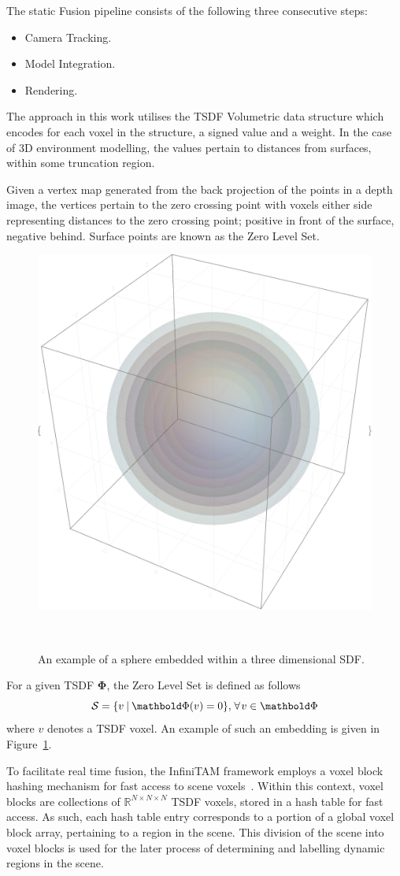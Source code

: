The static Fusion pipeline consists of the following three consecutive steps:
\begin{itemize}
  \item Camera Tracking.
  \item Model Integration.
  \item Rendering.
\end{itemize}

The approach in this work utilises the TSDF Volumetric data structure which
encodes for each voxel in the structure, a signed value and a weight.
In the case of 3D environment modelling, the values pertain to distances from
surfaces, within some truncation region.

Given a vertex map generated from the back projection of the points in a depth
image, the vertices pertain to the zero crossing point with voxels either side
representing distances to the zero crossing point; positive in front of the
surface, negative behind. Surface points are known as the Zero Level Set.
\begin{figure}[!htbp]
  \centering
  \includegraphics[width=.5\linewidth]{figures/moseg/3d_sdf.eps}
  \caption[Signed Distance Function]{An example of a sphere embedded within a 
  three dimensional SDF.}
~\label{figure:sdf_example}
\end{figure}

For a given TSDF \(\bm{\Phi}\), the Zero Level Set is defined as follows
\begin{equation}
  \label{eqn:zero_level_definition}
  \mathcal{S} = \{v \given \bm{\Phi}(v) = 0\}, 
  \mkern2mu \forall \mkern2mu v \in \bm{\Phi}
\end{equation}
where \(v\) denotes a TSDF voxel. An example of such an embedding is given in
Figure~\ref{figure:sdf_example}.

To facilitate real time fusion, the InfiniTAM framework employs a voxel block
hashing mechanism for fast access to scene voxels~\cite{NieBner2013}. Within
this context, voxel blocks are collections of \(\mathbb{R}^{N \times N \times N}\) 
TSDF voxels, stored in a hash table for fast access. As such, each hash table entry 
corresponds to a portion of a global voxel block array, pertaining to a region in the 
scene. This division of the scene into voxel blocks is used for the later process of 
determining and labelling dynamic regions in the scene.


